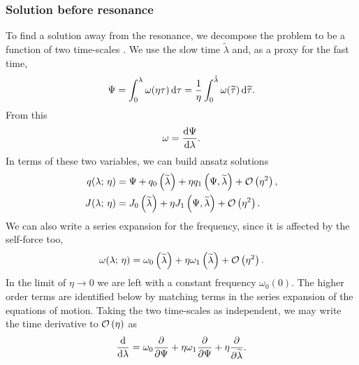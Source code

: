 \subsubsection{Solution before resonance}\label{sec:before-res}

To find a solution away from the resonance, we decompose the problem to be a function of two time-scales \citep{Kevorkian1971}. We use the slow time $\widetilde{\lambda}$ and, as a proxy for the fast time,
\begin{equation}
\Psi = \int_{0}^{\lambda}{\omega(\eta\tau)}\,\mathrm{d}{\tau} = \dfrac{1}{\eta}\int_{0}^{\tilde{\lambda}}{\omega(\widetilde{\tau})}\,\mathrm{d}{\widetilde{\tau}}.
\end{equation}
From this
\begin{equation}
\omega = \dfrac{\mathrm{d} {\Psi}}{\mathrm{d} {\lambda}}.
\end{equation}
In terms of these two variables, we can build ansatz solutions
\begin{subequations}
\begin{align}
\label{eq:q-series}
q(\lambda;\,\eta) = {} & \Psi + q_0\left(\widetilde{\lambda}\right) + \eta q_1\left(\Psi,\widetilde{\lambda}\right) + \mathcal{O}\left({\eta^2}\right), \\
J(\lambda;\,\eta) = {} & J_0\left(\widetilde{\lambda}\right) + \eta J_1\left(\Psi,\widetilde{\lambda}\right) + \mathcal{O}\left({\eta^2}\right).
\label{eq:J-series}
\end{align}
\end{subequations}
We can also write a series expansion for the frequency, since it is affected by the self-force too,
\begin{equation}
\omega(\lambda;\,\eta) = \omega_0\left(\widetilde{\lambda}\right) + \eta \omega_1\left(\widetilde{\lambda}\right) + \mathcal{O}\left({\eta^2}\right).
\end{equation}
In the limit of $\eta \rightarrow 0$ we are left with a constant frequency $\omega_0(0)$. The higher order terms are identified below by matching terms in the series expansion of the equations of motion. Taking the two time-scales as independent, we may write the time derivative to $\mathcal{O}\left({\eta}\right)$ as
\begin{equation}
\dfrac{\mathrm{d}}{\mathrm{d} {\lambda}} = \omega_0\dfrac{\partial}{\partial {\Psi}} + \eta\omega_1\dfrac{\partial}{\partial {\Psi}} + \eta\dfrac{\partial}{\partial {\widetilde{\lambda}}}.
\end{equation}

